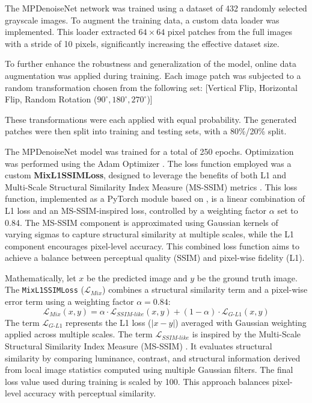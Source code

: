 The MPDenoiseNet network was trained using a dataset of 432 randomly selected grayscale images\cite{Rafiee2021}. To augment the training data, a custom data loader was implemented. This loader extracted $64 \times 64$ pixel patches from the full images with a stride of 10 pixels, significantly increasing the effective dataset size.

To further enhance the robustness and generalization of the model, online data augmentation was applied during training. Each image patch was subjected to a random transformation chosen from the following set: [Vertical Flip, Horizontal Flip, Random Rotation ($90^\circ, 180^\circ, 270^\circ$)]

These transformations were each applied with equal probability. The generated patches were then split into training and testing sets, with a 80\%/20\% split.

The MPDenoiseNet model was trained for a total of 250 epochs. Optimization was performed using the Adam Optimizer \cite{adam}. The loss function employed was a custom \textbf{MixL1SSIMLoss}, designed to leverage the benefits of both L1 and Multi-Scale Structural Similarity Index Measure (MS-SSIM) metrics \cite{Zhao2017}. This loss function, implemented as a PyTorch module based on \cite{Pessoa2023}, is a linear combination of L1 loss and an MS-SSIM-inspired loss, controlled by a weighting factor $\alpha$ set to 0.84. The MS-SSIM component is approximated using Gaussian kernels of varying sigmas to capture structural similarity at multiple scales, while the L1 component encourages pixel-level accuracy. This combined loss function aims to achieve a balance between perceptual quality (SSIM) and pixel-wise fidelity (L1).

Mathematically, let $x$ be the predicted image and $y$ be the ground truth image. The \texttt{MixL1SSIMLoss} ($\mathcal{L}_{Mix}$) combines a structural similarity term and a pixel-wise error term using a weighting factor $\alpha=0.84$:
\begin{equation} \label{eq:mix_loss}
\mathcal{L}_{Mix}(x, y) = \alpha \cdot \mathcal{L}_{SSIM\text{-}like}(x, y) + (1 - \alpha) \cdot \mathcal{L}_{G\text{-}L1}(x, y)
\end{equation}
The term $\mathcal{L}_{G\text{-}L1}$ represents the L1 loss ($|x - y|$) averaged with Gaussian weighting applied across multiple scales. The term $\mathcal{L}_{SSIM\text{-}like}$ is inspired by the Multi-Scale Structural Similarity Index Measure (MS-SSIM) \cite{Zhao2017}. It evaluates structural similarity by comparing luminance, contrast, and structural information derived from local image statistics computed using multiple Gaussian filters. The final loss value used during training is scaled by 100. This approach balances pixel-level accuracy with perceptual similarity.

